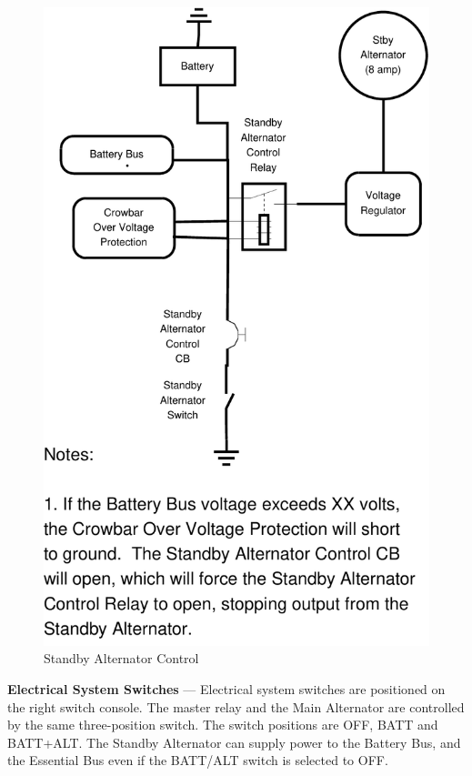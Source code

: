 \begin{figure}
\centering 
\includegraphics[scale=0.4]{../Diagrams/Alternator2_large_note_narrow} \caption{Standby Alternator Control}
\end{figure}

\textbf{Electrical System Switches} --- Electrical system switches are positioned on the right switch console. The master relay and the Main Alternator are controlled by the same three-position switch. The switch positions are OFF, BATT and BATT+ALT. The Standby Alternator can supply power to the Battery Bus, and the Essential Bus even if the BATT/ALT switch is selected to OFF.


